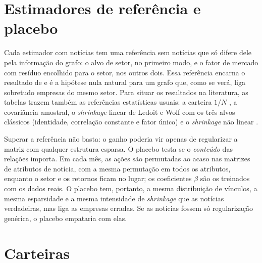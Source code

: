 \section{Estimadores de referência e placebo}
\label{sec:referencias}

Cada estimador com notícias tem uma referência sem notícias que só difere dele pela informação do
grafo: o alvo de setor, no primeiro modo, e o fator de mercado com resíduo encolhido para o setor, nos
outros dois. Essa referência encarna o resultado de \citet{elton1973} e é a hipótese nula natural para um
grafo que, como se verá, liga sobretudo empresas do mesmo setor. Para situar os resultados na literatura,
as tabelas trazem também as referências estatísticas usuais: a carteira $1/N$ \citep{demiguel2009}, a
covariância amostral, o \emph{shrinkage} linear de Ledoit e Wolf com os três alvos clássicos (identidade,
correlação constante e fator único) e o \emph{shrinkage} não linear \citep{ledoit2020}.

Superar a referência não basta: o ganho poderia vir apenas de regularizar a matriz com qualquer
estrutura esparsa. O placebo testa se o \emph{conteúdo} das relações importa. Em cada mês, as ações são
permutadas ao acaso nas matrizes de atributos de notícia, com a mesma permutação em todos os atributos,
enquanto o setor e os retornos ficam no lugar; os coeficientes $\beta$ são os treinados com os dados
reais. O placebo tem, portanto, a mesma distribuição de vínculos, a mesma esparsidade e a mesma
intensidade de \emph{shrinkage} que as notícias verdadeiras, mas liga as empresas erradas. Se as notícias
fossem só regularização genérica, o placebo empataria com elas.

\section{Carteiras}
\label{sec:carteiras-metodo}

